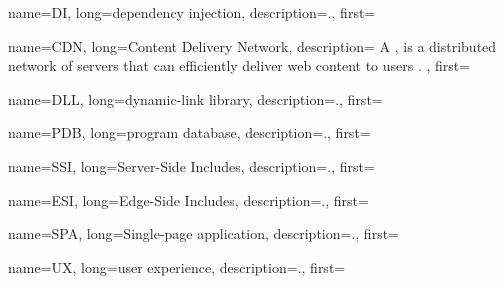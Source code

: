 {
    name=DI,
    long={dependency injection},
    description={.},
    first=
}

{
    name=CDN,
    long={Content Delivery Network},
    description={
    A , is a distributed network of servers that can
    efficiently deliver web content to users \autocite{Microsoft_2018}.
        },
    first=
}

{
    name=DLL,
    long={dynamic-link library},
    description={.},
    first=
}

{
    name=PDB,
    long={program database},
    description={.},
    first=
}

{
    name=SSI,
    long={Server-Side Includes},
    description={.},
    first=
}

{
    name=ESI,
    long={Edge-Side Includes},
    description={.},
    first=
}

{
    name=SPA,
    long={Single-page application},
    description={.},
    first=
}

{
    name=UX,
    long={user experience},
    description={.},
    first=
}
